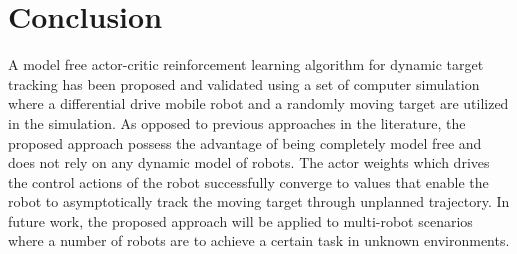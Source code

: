 \documentclass[conference]{IEEEtran}
\begin{document}
\section{Conclusion} \label{sec:conclusion}

A model free actor-critic reinforcement learning algorithm for dynamic target
tracking has been proposed and validated using a set of computer simulation
where a differential drive mobile robot and a randomly moving target are
utilized in the simulation. As opposed to previous approaches in the literature,
the proposed approach possess the advantage of being completely model free and
does not  rely on any dynamic model of robots. The actor weights which
drives the control actions of the robot successfully converge to values that
enable the robot to asymptotically track the moving target through unplanned
trajectory. In future work, the proposed approach will be applied to multi-robot scenarios
where a number of robots are to achieve a certain task in unknown environments.
 


	

\end{document}
